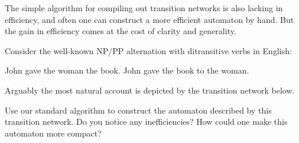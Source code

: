 \begin{exercise}
    The simple algorithm for compiling out transition networks is also lacking in efficiency, and often one can construct a more efficient automaton by hand.
    But the gain in efficiency comes at the cost of clarity and generality.

    Consider the well-known NP\slash PP alternation with ditransitive verbs in English:
    \begin{exe}
        \ex
        \begin{xlist}
            \ex John gave the woman the book.
            \ex John gave the book to the woman.
        \end{xlist}
    \end{exe}
    Arguably the most natural account is depicted by the transition network below.
    \begin{center}
    \end{center}
    Use our standard algorithm to construct the automaton described by this transition network.
    Do you notice any inefficiencies?
    How could one make this automaton more compact?
\end{exercise}

